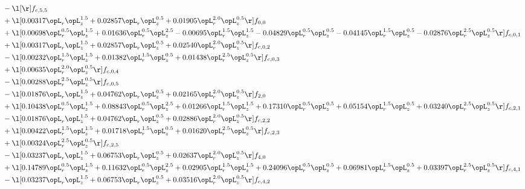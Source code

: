 \begin{alignat}{2}
& - \l[  \r] f_{c,5,5} \nonumber \\ 
& + \l[  0.00317 \opL_r \opL_z^{1.5} +  0.02857 \opL_r \opL_z^{0.5} +  0.01905 \opL_r^{2.0} \opL_z^{0.5}  \r] f_{0,0} \nonumber \\ 
& + \l[  0.00698 \opL_r^{0.5} \opL_z^{1.5} +  0.01636 \opL_r^{0.5} \opL_z^{2.5}   -0.00695 \opL_r^{1.5} \opL_z^{1.5}   -0.04829 \opL_r^{0.5} \opL_z^{0.5}   -0.04145 \opL_r^{1.5} \opL_z^{0.5}   -0.02876 \opL_r^{2.5} \opL_z^{0.5}  \r] f_{c,0,1} \nonumber \\ 
& + \l[  0.00317 \opL_r \opL_z^{1.5} +  0.02857 \opL_r \opL_z^{0.5} +  0.02540 \opL_r^{2.0} \opL_z^{0.5}  \r] f_{c,0,2} \nonumber \\ 
& - \l[  0.00232 \opL_r^{1.5} \opL_z^{1.5} +  0.01382 \opL_r^{1.5} \opL_z^{0.5} +  0.01438 \opL_r^{2.5} \opL_z^{0.5}  \r] f_{c,0,3} \nonumber \\ 
& + \l[  0.00635 \opL_r^{2.0} \opL_z^{0.5}  \r] f_{c,0,4} \nonumber \\ 
& - \l[  0.00288 \opL_r^{2.5} \opL_z^{0.5}  \r] f_{c,0,5} \nonumber \\ 
& - \l[  0.01876 \opL_r \opL_z^{1.5} +  0.04762 \opL_r \opL_z^{0.5} +  0.02165 \opL_r^{2.0} \opL_z^{0.5}  \r] f_{2,0} \nonumber \\ 
& + \l[  0.10438 \opL_r^{0.5} \opL_z^{1.5} +  0.08843 \opL_r^{0.5} \opL_z^{2.5} +  0.01266 \opL_r^{1.5} \opL_z^{1.5} +  0.17310 \opL_r^{0.5} \opL_z^{0.5} +  0.05154 \opL_r^{1.5} \opL_z^{0.5} +  0.03240 \opL_r^{2.5} \opL_z^{0.5}  \r] f_{c,2,1} \nonumber \\ 
& - \l[  0.01876 \opL_r \opL_z^{1.5} +  0.04762 \opL_r \opL_z^{0.5} +  0.02886 \opL_r^{2.0} \opL_z^{0.5}  \r] f_{c,2,2} \nonumber \\ 
& + \l[  0.00422 \opL_r^{1.5} \opL_z^{1.5} +  0.01718 \opL_r^{1.5} \opL_z^{0.5} +  0.01620 \opL_r^{2.5} \opL_z^{0.5}  \r] f_{c,2,3} \nonumber \\ 
& + \l[  0.00324 \opL_r^{2.5} \opL_z^{0.5}  \r] f_{c,2,5} \nonumber \\ 
& - \l[  0.03237 \opL_r \opL_z^{1.5} +  0.06753 \opL_r \opL_z^{0.5} +  0.02637 \opL_r^{2.0} \opL_z^{0.5}  \r] f_{4,0} \nonumber \\ 
& + \l[  0.14789 \opL_r^{0.5} \opL_z^{1.5} +  0.11632 \opL_r^{0.5} \opL_z^{2.5} +  0.02905 \opL_r^{1.5} \opL_z^{1.5} +  0.24096 \opL_r^{0.5} \opL_z^{0.5} +  0.06981 \opL_r^{1.5} \opL_z^{0.5} +  0.03397 \opL_r^{2.5} \opL_z^{0.5}  \r] f_{c,4,1} \nonumber \\ 
& - \l[  0.03237 \opL_r \opL_z^{1.5} +  0.06753 \opL_r \opL_z^{0.5} +  0.03516 \opL_r^{2.0} \opL_z^{0.5}  \r] f_{c,4,2} \nonumber \\ 

\end{alignat}
